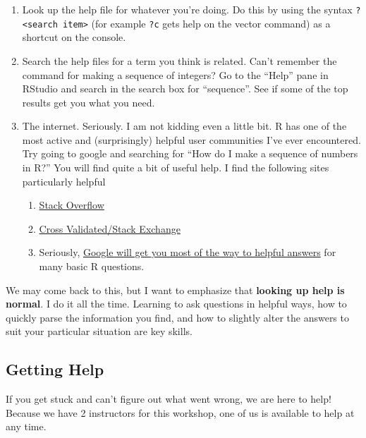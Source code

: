 \documentclass[
]{book}
\providecommand{\tightlist}{%
  \setlength{\itemsep}{0pt}\setlength{\parskip}{0pt}}
\begin{document}
\begin{enumerate}
\def\labelenumi{\arabic{enumi}.}
\tightlist
\item
  Look up the help file for whatever you're doing. Do this by using the syntax \texttt{?\textless{}search\ item\textgreater{}} (for example \texttt{?c} gets help on the vector command) as a shortcut on the console.
\item
  Search the help files for a term you think is related. Can't remember the command for making a sequence of integers? Go to the ``Help'' pane in RStudio and search in the search box for ``sequence''. See if some of the top results get you what you need.
\item
  The internet. Seriously. I am not kidding even a little bit. R has one of the most active and (surprisingly) helpful user communities I've ever encountered. Try going to google and searching for ``How do I make a sequence of numbers in R?'' You will find quite a bit of useful help. I find the following sites particularly helpful

  \begin{enumerate}
  \def\labelenumii{\arabic{enumii}.}
  \tightlist
  \item
    \href{https://stackoverflow.com/questions/tagged/r}{Stack Overflow}
  \item
    \href{https://stats.stackexchange.com/questions/tagged/r}{Cross Validated/Stack Exchange}
  \item
    Seriously, \href{https://is.gd/80V5zF}{Google will get you most of the way to helpful answers} for many basic R questions.
  \end{enumerate}
\end{enumerate}

We may come back to this, but I want to emphasize that \textbf{looking up help is normal}. I do it all the time. Learning to ask questions in helpful ways, how to quickly parse the information you find, and how to slightly alter the answers to suit your particular situation are key skills.

\hypertarget{getting-help}{%
\subsection*{Getting Help}\label{getting-help}}

If you get stuck and can't figure out what went wrong, we are here to help! Because we have 2 instructors for this workshop, one of us is available to help at any time.
\end{document}
